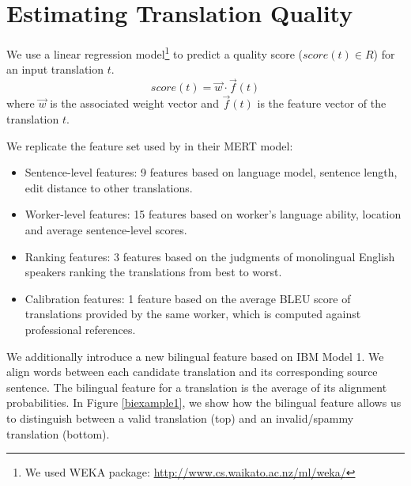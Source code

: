 \onehalfspaced

\section{Estimating Translation Quality}
We use a linear regression model\footnote{We used WEKA package: \url{http://www.cs.waikato.ac.nz/ml/weka/}} to predict a quality score ($ score(t) \in R$) for an input translation $t$.
\[ score(t) = \vec{w}  \cdot \vec f(t) \]
  where $\vec{w}$ is the associated weight vector and $\vec f(t)$ is the feature vector of the translation $t$. 

We replicate the feature set used by  in their MERT model:

\begin{itemize}
\item  Sentence-level features: 9 features based on language model, sentence length, edit distance to other translations. 
\item Worker-level features: 15 features based on worker's language ability, location and average sentence-level scores.
\item Ranking features: 3 features based on the judgments of monolingual English speakers ranking the translations from best to worst.
\item Calibration features: 1 feature based on the average BLEU score of translations provided by the same worker, which is computed against professional references.
\end{itemize}


We additionally introduce a new bilingual feature based on IBM Model 1. We align words between each candidate translation and its corresponding source sentence. The bilingual feature for a translation is the average of its alignment probabilities. In Figure \ref{biexample1}, we show how the bilingual feature allows us to distinguish between a valid translation (top) and an invalid/spammy translation (bottom).

